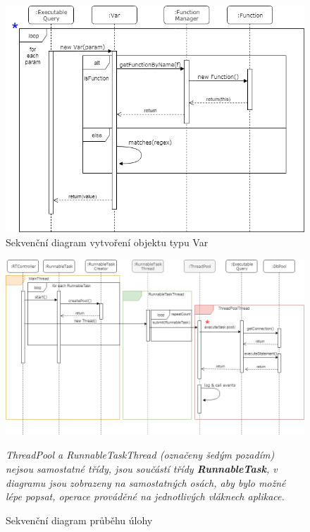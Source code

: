 \documentclass[czech,bachelor,public,dept460,male,cpdeclaration,twoside]{diploma}
\begin{document}
\begin{figure}[!htbp]\centering\includegraphics[width=1.0\textwidth]{Figures/var.png}\caption{Sekvenční diagram vytvoření objektu typu Var}
\label{seqvar}
\end{figure}


\newpage


\begin{figure}[!htbp]\centering\includegraphics[width=1.0\textwidth]{Figures/runtask.png}\caption{Sekvenční diagram průběhu úlohy}
\label{seqruntask}

\textit{ThreadPool a RunnableTaskThread (označeny šedým pozadím) nejsou samostatné třídy, jsou součástí třídy \textbf{\emph{RunnableTask}}, v diagramu jsou zobrazeny na samostatných osách, aby bylo možné lépe popsat, operace prováděné na jednotlivých vláknech aplikace. }
\end{figure}
\end{document}
